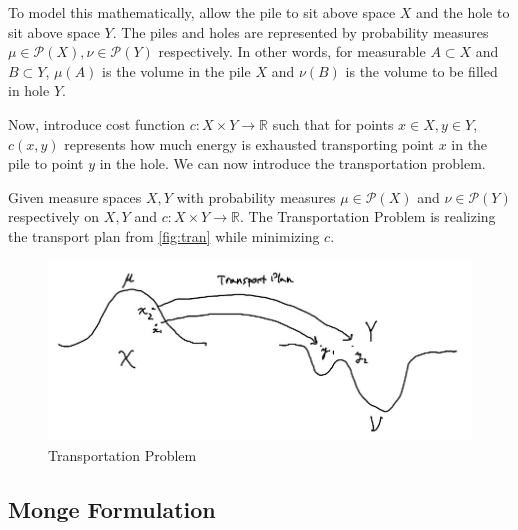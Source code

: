 \documentclass[12pt]{article}
\newcommand{\comp}[2]{
\vspace{0.2in}\begin{mdframed}[
  backgroundcolor=problem,
  userdefinedwidth=10cm,
  align=center,
  skipabove=\topsep,
  skipbelow=\topsep
  ]
  \emph{{#1}:\newline} {#2}
\end{mdframed}}
\theoremstyle{plain}
\numberwithin{equation}{section}
\begin{document}
To model this mathematically, allow the pile to sit above space $X$ and the hole to sit above space $Y$. The piles and holes are represented by probability measures $\mu\in\mathcal{P}(X),\nu\in\mathcal{P}(Y)$ respectively.
In other words, for measurable $A\subset X$ and $B\subset Y$, $\mu(A)$ is the volume in the pile $X$ and $\nu(B)$ is the volume to be filled in hole $Y$.

Now, introduce cost function $c: X\times Y \to \mathbb{R}$ such that for points $x\in X,y\in Y$, $c(x,y)$ represents how much energy is exhausted transporting point $x$ in the pile to point $y$ in the hole.
We can now introduce the transportation problem.

Given measure spaces $X,Y$ with probability measures $\mu\in \mathcal{P}(X)$ and $\nu\in\mathcal{P}(Y)$ respectively on $X,Y$ and $c: X\times Y\to \mathbb{R}$. The Transportation Problem is realizing the transport plan from \autoref{fig:tran} while minimizing $c$.
\begin{figure}[H]
  \center
  \includegraphics[scale=0.3]{transport.jpg}
  \caption{Transportation Problem}
  \label{fig:tran}
\end{figure}
\subsection{Monge Formulation}
\end{document}
